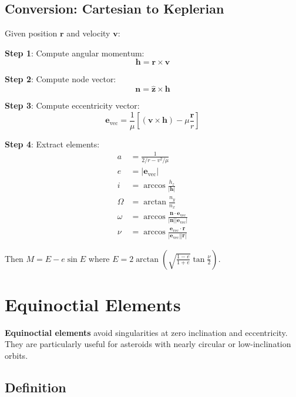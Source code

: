 \subsection{Conversion: Cartesian to Keplerian}

Given position $\mathbf{r}$ and velocity $\mathbf{v}$:

\textbf{Step 1}: Compute angular momentum:
\begin{equation}
    \mathbf{h} = \mathbf{r} \times \mathbf{v}
\end{equation}

\textbf{Step 2}: Compute node vector:
\begin{equation}
    \mathbf{n} = \mathbf{\hat{z}} \times \mathbf{h}
\end{equation}

\textbf{Step 3}: Compute eccentricity vector:
\begin{equation}
    \mathbf{e}_{\text{vec}} = \frac{1}{\mu}\left[(\mathbf{v} \times \mathbf{h}) - \mu\frac{\mathbf{r}}{r}\right]
\end{equation}

\textbf{Step 4}: Extract elements:
\begin{align}
    a &= \frac{1}{2/r - v^2/\mu} \\
    e &= |\mathbf{e}_{\text{vec}}| \\
    i &= \arccos\frac{h_z}{|\mathbf{h}|} \\
    \Omega &= \arctan\frac{n_y}{n_x} \\
    \omega &= \arccos\frac{\mathbf{n} \cdot \mathbf{e}_{\text{vec}}}{|\mathbf{n}||\mathbf{e}_{\text{vec}}|} \\
    \nu &= \arccos\frac{\mathbf{e}_{\text{vec}} \cdot \mathbf{r}}{|\mathbf{e}_{\text{vec}}||\mathbf{r}|}
\end{align}

Then $M = E - e\sin E$ where $E = 2\arctan\left(\sqrt{\frac{1-e}{1+e}}\tan\frac{\nu}{2}\right)$.

\section{Equinoctial Elements}

\textbf{Equinoctial elements} avoid singularities at zero inclination and eccentricity. They are particularly useful for asteroids with nearly circular or low-inclination orbits.

\subsection{Definition}

